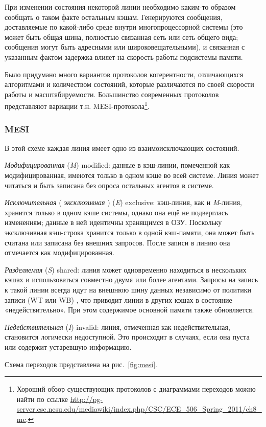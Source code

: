 При изменении состояния некоторой линии необходимо каким-то образом сообщать о таком факте остальным кэшам. Генерируются сообщения, доставляемые по какой-либо среде внутри многопроцессорной системы (это может быть общая шина, полностью связанная сеть или сеть общего вида; сообщения могут быть адресными или широковещательными), и связанная с указанным фактом задержка влияет на скорость работы подсистемы памяти.

Было придумано много вариантов протоколов когерентности, отличающихся алгоритмами и количеством состояний, которые различаются по своей скорости работы и масштабируемости. Большинство современных протоколов представляют вариации т.н. MESI-протокола\footnote{Хороший обзор существующих протоколов с диаграммами переходов можно найти по ссылке \url{http://pg-server.csc.ncsu.edu/mediawiki/index.php/CSC/ECE_506_Spring_2011/ch8_mc}.}.

\subsubsection{MESI}

В этой схеме каждая линия имеет одно из взаимоисключающих состояний.

\begin{itemize*}
\item    \textit{Модифицированная} (\textit{M}) \abbr modified: данные в кэш-линии, помеченной как модифицированная, имеются только в одном кэше во всей системе. Линия может читаться и быть записана без опроса остальных агентов в системе.

\item    \textit{Исключительная} ( \textit{эксклюзивная} ) (\textit{E}) \abbr exclusive: кэш-линия, как и \textit{M}-линия, хранится только в одном кэше системы, однако она ещё не подверглась изменениям; данные в ней идентичны хранящимся в ОЗУ. Поскольку эксклюзивная кэш-строка хранится только в одной кэш-памяти, она может быть считана или записана без внешних запросов. После записи в линию она отмечается как модифицированная.

\item    \textit{Разделяемая} (\textit{S}) \abbr shared: линия может одновременно находиться в нес\-коль\-ких кэшах и использоваться совместно двумя или более агентами. Запросы на запись к такой линии  всегда идут на внешнюю шину данных независимо от политики записи (WT или WB) , что приводит линии в других кэшах в состояние «недействительно». При этом содержимое основной памяти также обновляется.

\item    \textit{Недействительная} (\textit{I}) \abbr invalid: линия, отмеченная как недействительная, становится логически недоступной. Это происходит в случаях, если она пуста или содержит устаревшую информацию. 

\end{itemize*}
Схема переходов представлена на рис.~\ref{fig:mesi}.

